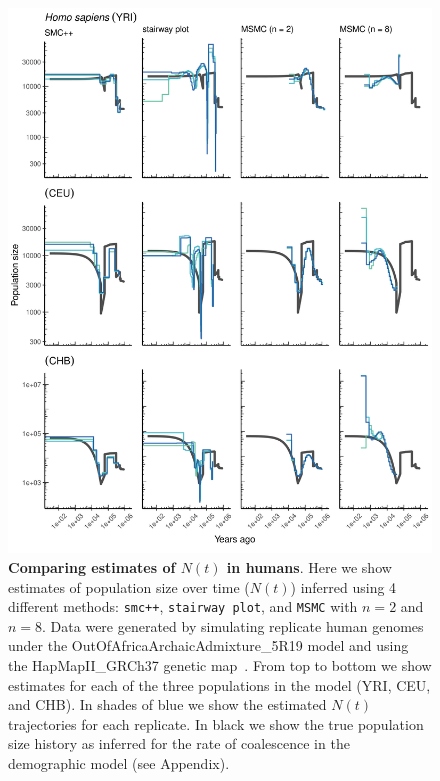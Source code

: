 \documentclass[12pt,halfline,a4paper]{ouparticle}
\newcommand{\MSMC}{\texttt{MSMC}\xspace}
\newcommand{\smcpp}{\texttt{smc++}\xspace}
\begin{document}
\begin{figure}
\begin{center}
\includegraphics[width=0.8\linewidth]{display_items/homo_sapiens_mask_Ragsdale.png}
\caption{\textbf{Comparing estimates of $N(t)$ in humans}. Here we show estimates of population
size over time ($N(t)$) inferred using 4 different methods: \smcpp, \texttt{stairway plot}, and
\MSMC with $n=2$ and $n=8$. Data were generated by simulating
replicate human genomes under the OutOfAfricaArchaicAdmixture\_5R19 model and using the
HapMapII\_GRCh37 genetic map~\citep{international2007second}. From top to bottom we show estimates for each
of the three populations in the model (YRI, CEU, and CHB). In shades of blue we show the estimated
$N(t)$ trajectories for each replicate. In black we show the true population size history as inferred
for the rate of coalescence in the demographic model (see Appendix).}
\label{fig:n_t_ragsdale}
\end{center}
\end{figure}
\end{document}
